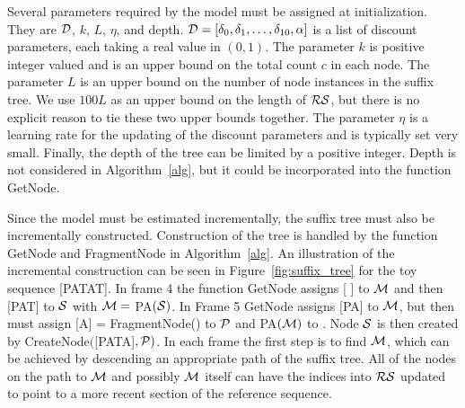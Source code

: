 
Several parameters required by the model must be assigned at initialization.  They are $\D$, $k$, $L$, $\eta$,  and depth.  $\D = [\dd_0, \dd_1, \ldots, \dd_{10}, \alpha]$ is a list of discount parameters, each taking a real value in $(0,1)$.  The parameter $k$ is positive integer valued and is an upper bound on the total count $c$ in each node.  The parameter $L$ is an upper bound on the number of node instances in the suffix tree.  We use $100L$ as an upper bound on the length of $\RS$, but there is no explicit reason to tie these two upper bounds together. The parameter $\eta$ is a learning rate for the updating of the discount parameters and is typically set very small.  Finally, the depth of the tree can be limited by a positive integer.  Depth is not considered in Algorithm~\ref{alg}, but it could be incorporated into the function GetNode.

Since the model must be estimated incrementally, the suffix tree must also be incrementally constructed.  Construction of the tree is handled by the function GetNode and FragmentNode in Algorithm~\ref{alg}.  An illustration of the incremental construction can be seen in Figure~\ref{fig:suffix_tree} for the toy sequence [PATAT].   In frame 4 the function GetNode assigns [ ]  to $\M$ and then [PAT] to $\Seq$ with $\M = $ PA$(\Seq)$. In Frame 5 GetNode assigns [PA] to $\M$, but then must assign [A] = FragmentNode(\M) to $\PP$ and PA$(\M)$ to \PP.  Node $\Seq$ is then created by CreateNode$($[PATA]$,\PP)$.  In each frame the first step is to find $\M$, which can be achieved by descending an appropriate path of the suffix tree.  All of the nodes on the path to $\M$ and possibly $\M$ itself can have the indices into $\RS$ updated to point to a more recent section of the reference sequence. 

